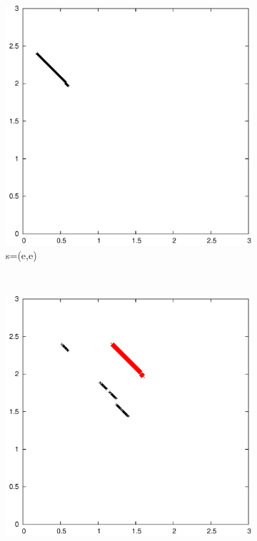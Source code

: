 \documentclass{article}
\begin{document}
	\begin{figure}
		\centering
		\begin{subfigure}[b]{0.3\textwidth}
			\centering
			\includegraphics[width=\textwidth]{images/t3s0}
			\caption{s=(e,e)}
			\label{fig:t3s0}
		\end{subfigure}
		~
		\begin{subfigure}[b]{0.3\textwidth}
			\centering
			\includegraphics[width=\textwidth]{images/t3s1}

\end{subfigure}
\end{figure}
\end{document}
